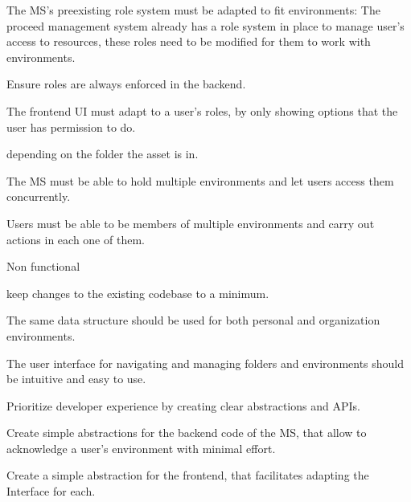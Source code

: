 \begin{myEnumerate}
\begin{myEnumerate}
\begin{myEnumerate}
\begin{myEnumerate}
              \item The MS's preexisting role system must be adapted to fit environments:
                The proceed management system already has a role system in place to manage user's access to resources, these roles need to be modified for them to work with environments.
                \begin{myEnumerate}
                  \item Ensure roles are always enforced in the backend.
                  \item The frontend UI must adapt to a user's roles, by only showing options that the user has permission to do.
                \end{myEnumerate}
                depending on the folder the asset is in.
            \end{myEnumerate}

        \end{myEnumerate}

      \item The MS must be able to hold multiple environments and let users access them concurrently.

      \item Users must be able to be members of multiple environments and carry out actions in each one of them.


    \end{myEnumerate}

  \item Non functional
    \begin{myEnumerate}
      \item keep changes to the existing codebase to a minimum.

      \item The same data structure should be used for both personal and organization environments.


      \item The user interface for navigating and managing folders and environments should
        be intuitive and easy to use.

      \item Prioritize developer experience by creating clear abstractions and APIs.
        \begin{myEnumerate}
          \item Create simple abstractions for the backend code of the MS, that allow to acknowledge a user's environment with minimal effort.
          \item Create a simple abstraction for the frontend, that facilitates adapting
            the Interface for each.
        \end{myEnumerate}


\end{myEnumerate}
\end{myEnumerate}
